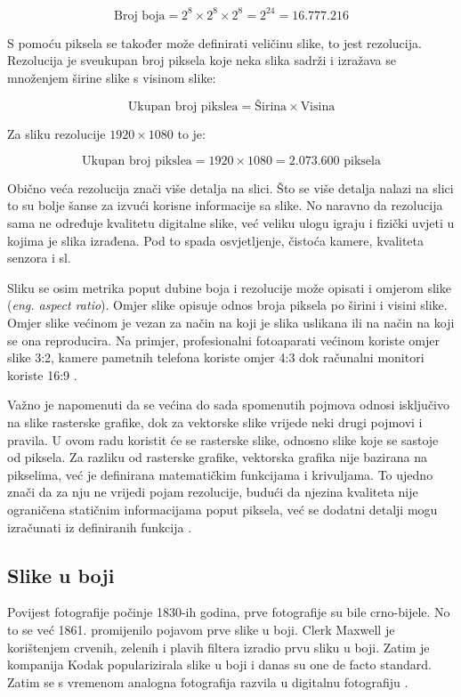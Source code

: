 \documentclass{foi}
\begin{document}
\[
\text{Broj boja} = 2^{8} \times 2^{8} \times 2^{8} = 2^{24} = 16.777.216
\]

S pomoću piksela se također može definirati veličinu slike, to jest rezolucija. Rezolucija je sveukupan broj piksela koje neka slika sadrži i izražava se množenjem širine slike s visinom slike:

\[
\text{Ukupan broj pikslea} = \text{Širina} \times \text{Visina}
\]

Za sliku rezolucije $1920 \times 1080$ to je:

\[
\text{Ukupan broj pikslea} = 1920 \times 1080 = 2.073.600 \text{ piksela}
\]

Obično veća rezolucija znači više detalja na slici. Što se više detalja nalazi na slici to su bolje šanse za izvući korisne informacije sa slike. No naravno da rezolucija sama ne određuje kvalitetu digitalne slike, već veliku ulogu igraju i fizički uvjeti u kojima je slika izrađena. Pod to spada osvjetljenje, čistoća kamere, kvaliteta senzora i sl.

Sliku se osim metrika poput dubine boja i rezolucije može opisati i omjerom slike (\textit{eng. aspect ratio}). Omjer slike opisuje odnos broja piksela po širini i visini slike. Omjer slike većinom je vezan za način na koji je slika uslikana ili na način na koji se ona reproducira. Na primjer, profesionalni fotoaparati većinom koriste omjer slike 3:2, kamere pametnih telefona koriste omjer 4:3 dok računalni monitori koriste 16:9 \cite{AspectRatio}.

Važno je napomenuti da se većina do sada spomenutih pojmova odnosi isključivo na slike rasterske grafike, dok za vektorske slike vrijede neki drugi pojmovi i pravila. U ovom radu koristit će se rasterske slike, odnosno slike koje se sastoje od piksela. Za razliku od rasterske grafike, vektorska grafika nije bazirana na pikselima, već je definirana matematičkim funkcijama i krivuljama. To ujedno znači da za nju ne vrijedi pojam rezolucije, budući da njezina kvaliteta nije ograničena statičnim informacijama poput piksela, već se dodatni detalji mogu izračunati iz definiranih funkcija \cite{DigitalnaSlika}.

\subsection{Slike u boji}

Povijest fotografije počinje 1830-ih godina, prve fotografije su bile crno-bijele. No to se već 1861. promijenilo pojavom prve slike u boji. Clerk Maxwell je korištenjem crvenih, zelenih i plavih filtera izradio prvu sliku u boji. Zatim je kompanija Kodak popularizirala slike u boji i danas su one de facto standard. Zatim se s vremenom analogna fotografija razvila u digitalnu fotografiju \cite{ImageHistory}.
\end{document}
